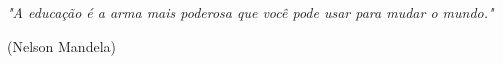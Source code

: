 \documentclass[
	12pt,				%
	openany,			%
	oneside,			%
	a4paper,			%
	english,			%
	french,				%
	spanish,			%
	brazil				%
	]{abntex2}
\begin{document}

 \begin{epigrafe}
\par\null\par\null\par\null\par\null\par\null\par\null\par\null\par\null\par\null\par\null\par\null\par\null\par\null\par\null\par\null\par\null\par\null\par\null\par\null\par\null\par\null\par\null\par\null\par\null\par\null\par\null\par\null\par\null\par\null\par\null\par\null\par

\epigraph{\textit{"A educação é a arma mais poderosa que você pode usar para mudar o mundo."}}{(Nelson Mandela)}


 \end{epigrafe}


\end{document}
